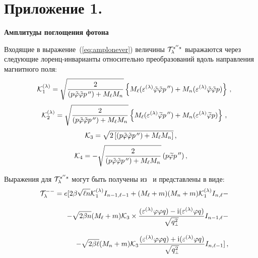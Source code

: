 \documentclass[14pt, russian]{article}
\def\mprp{\mbox{\tiny $\bot$}}
\newcommand{\ii}{\mathrm{i}} %
\begin{document}
\section*{Приложение 1.}

\begin{center}
	\textbf{Амплитуды поглощения фотона}
\end{center}


Входящие в выражение~(\ref{eq:amplonever}) величины ${\cal T}^{s'' s}_\lambda$ выражаются через следующие 
лоренц-инварианты относительно преобразований вдоль направления магнитного поля:
%
\begin{eqnarray}
	\label{eq:K1}
	&&{\cal K}_{1}^{(\lambda)} = \sqrt{\frac{2}{(p\tilde \varphi\tilde \varphi p^{\, \prime \prime}) + M_\ell M_{n}}} 
	\left \{M_\ell (\varepsilon^{(\lambda)}\tilde \varphi\tilde \varphi p^{\, \prime \prime}) + 
	M_{n} (\varepsilon^{(\lambda)}\tilde \varphi\tilde \varphi p)  \right \}\, ,
\end{eqnarray}
%
\begin{eqnarray}
	&&{\cal K}_{2}^{(\lambda)} = \sqrt{\frac{2}{(p\tilde \varphi\tilde \varphi p^{\, \prime \prime}) + M_\ell M_{n}}} 
	\left \{M_\ell (\varepsilon^{(\lambda)}\widetilde \varphi p^{\, \prime \prime}) + 
	M_{n} (\varepsilon^{(\lambda)}\widetilde \varphi p)  \right \}\, ,
	\label{eq:K2}
\end{eqnarray}
%
\begin{eqnarray}
	{\cal K}_{3} = \sqrt{2\left [(p\tilde \varphi\tilde \varphi p^{\, \prime \prime}) + 
		M_\ell M_{n} \right]} \, ,  
\end{eqnarray}
%
\begin{eqnarray}
	{\cal K}_4 = 
	- \sqrt{\frac{2}{(p\tilde \varphi\tilde \varphi p^{\, \prime \prime}) + M_\ell M_{n}}}\, 
	(p\widetilde \varphi p^{\, \prime \prime}) \, ,
	\label{eq:K34}
\end{eqnarray}
%

Выражения для ${\cal T}^{s'' s}_\lambda$ могут быть получены из~\cite{Rumyantsev:2017} и представлены в виде:
%
\begin{eqnarray}
	\label{eq:tV--}
	\nonumber
	&&{\cal T}^{--}_\lambda  = e [ 2\beta\sqrt{\ell n} {\cal K}_1^{(\lambda)} I_{n-1,\ell-1} +
	(M_\ell + m)(M_n + m) {\cal K}_1^{(\lambda)} I_{n,\ell} -
	\\[3mm]
	&&-
	\sqrt{2\beta n} (M_\ell + m) {\cal K}_3
	\times\frac{(\varepsilon^{(\lambda)}\varphi\varphi q) - 
		\ii (\varepsilon^{(\lambda)} \varphi q)}{\sqrt{q^2_{\mprp}}} I_{n-1,\ell} -
	\\[3mm]
	\nonumber
	&&- \sqrt{2\beta \ell} (M_n + m) {\cal K}_3 
	\frac{(\varepsilon^{(\lambda)}\varphi\varphi q) + \ii (\varepsilon^{(\lambda)}\varphi q)}{\sqrt{q^2_{\mprp}}} I_{n,\ell-1}] \, ,
\end{eqnarray}
\end{document}
